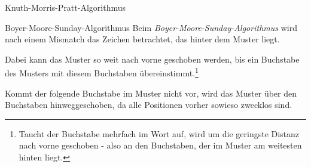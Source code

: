 \begin{example}{Knuth-Morris-Pratt-Algorithmus}
\begin{center}
    \end{center}
\end{example}

\begin{algo}{Boyer-Moore-Sunday-Algorithmus}
    Beim \emph{Boyer-Moore-Sunday-Algorithmus} wird nach einem Mismatch das Zeichen betrachtet, das hinter dem Muster liegt.

    Dabei kann das Muster so weit nach vorne geschoben werden, bis ein Buchstabe des Musters mit diesem Buchstaben übereinstimmt.\footnote{Taucht der Buchstabe mehrfach im Wort auf, wird um die geringste Distanz nach vorne geschoben - also an den Buchstaben, der im Muster am weitesten hinten liegt.}

    Kommt der folgende Buchstabe im Muster nicht vor, wird das Muster über den Buchstaben hinweggeschoben, da alle Positionen vorher sowieso zwecklos sind.
\end{algo}


